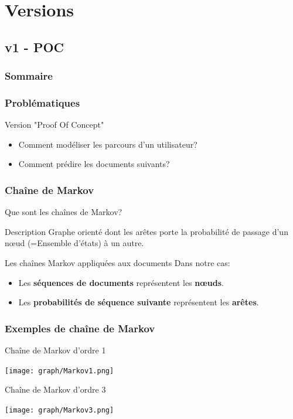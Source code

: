 \documentclass{beamer}
\begin{document}
    \section{Versions}
        \subsection{v1 - POC}
            \begin{frame}
                \frametitle{Sommaire}
            \end{frame}
            \begin{frame}
            \frametitle{Problématiques}
            Version "Proof Of Concept"
            \begin{itemize}
            \pause
            \item Comment modéliser les parcours d'un utilisateur?
            \pause
            \item Comment prédire les documents suivants?
            \end{itemize}
            \end{frame}
            \begin{frame}
            \frametitle{Chaîne de Markov}
            Que sont les chaînes de Markov?
            \pause
            \begin{block}{Description}
            Graphe orienté dont les arêtes porte la probabilité de passage d'un nœud (=Ensemble d'états) à un autre.
            \end{block}
            \pause
            \begin{block}{Les chaînes Markov appliquées aux documents}
            Dans notre cas:
            \begin{itemize}
            \item Les \textbf{séquences de documents} représentent les \textbf{nœuds}.
            \item Les \textbf{probabilités de séquence suivante} représentent les \textbf{arêtes}.
            \end{itemize}
            \end{block}
            \end{frame}
            \begin{frame}
            \frametitle{Exemples de chaîne de Markov}
            \pause
            \begin{exampleblock}{Chaîne de Markov d'ordre 1}
            \begin{center}
            \texttt{[image: graph/Markov1.png]}
            \end{center}
            \end{exampleblock}
            \pause
            \begin{exampleblock}{Chaîne de Markov d'ordre 3}
            \begin{center}
            \texttt{[image: graph/Markov3.png]}
            \end{center}
            \end{exampleblock}
            \end{frame}
\end{document}
